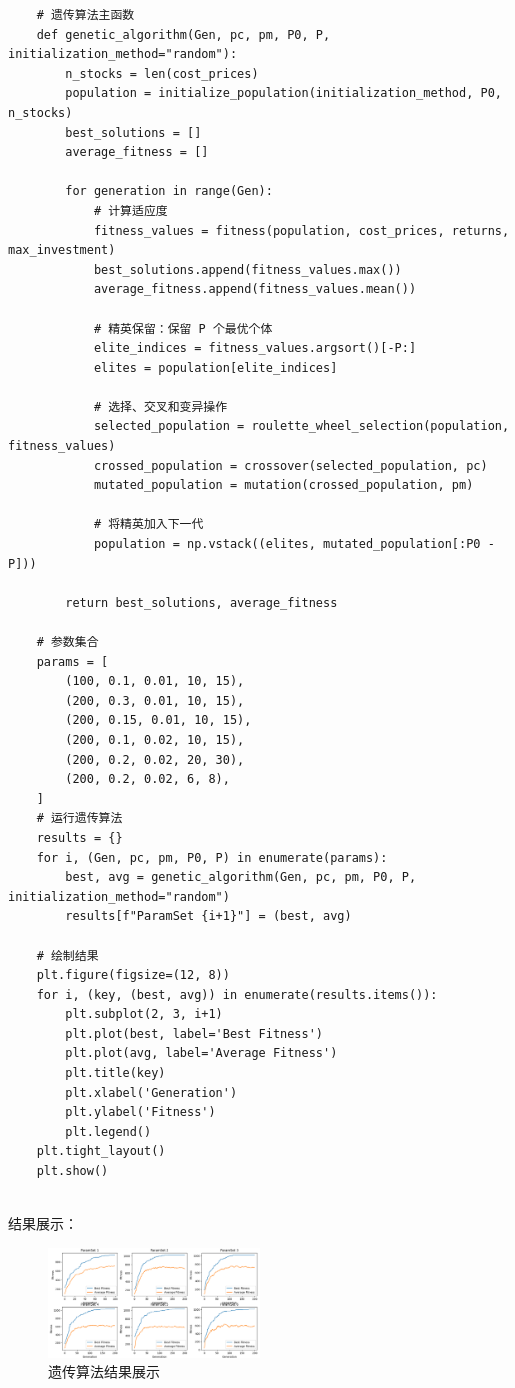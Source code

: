\documentclass[journal,twoside,web]{ieeecolor}
\begin{document}
\begin{lstlisting}
    # 遗传算法主函数
    def genetic_algorithm(Gen, pc, pm, P0, P, initialization_method="random"):
        n_stocks = len(cost_prices)
        population = initialize_population(initialization_method, P0, n_stocks)
        best_solutions = []
        average_fitness = []
    
        for generation in range(Gen):
            # 计算适应度
            fitness_values = fitness(population, cost_prices, returns, max_investment)
            best_solutions.append(fitness_values.max())
            average_fitness.append(fitness_values.mean())
    
            # 精英保留：保留 P 个最优个体
            elite_indices = fitness_values.argsort()[-P:]
            elites = population[elite_indices]
    
            # 选择、交叉和变异操作
            selected_population = roulette_wheel_selection(population, fitness_values)
            crossed_population = crossover(selected_population, pc)
            mutated_population = mutation(crossed_population, pm)
    
            # 将精英加入下一代
            population = np.vstack((elites, mutated_population[:P0 - P]))
    
        return best_solutions, average_fitness
    
    # 参数集合
    params = [
        (100, 0.1, 0.01, 10, 15),
        (200, 0.3, 0.01, 10, 15),
        (200, 0.15, 0.01, 10, 15),
        (200, 0.1, 0.02, 10, 15),
        (200, 0.2, 0.02, 20, 30),
        (200, 0.2, 0.02, 6, 8),
    ]
    # 运行遗传算法
    results = {}
    for i, (Gen, pc, pm, P0, P) in enumerate(params):
        best, avg = genetic_algorithm(Gen, pc, pm, P0, P, initialization_method="random")
        results[f"ParamSet {i+1}"] = (best, avg)
    
    # 绘制结果
    plt.figure(figsize=(12, 8))
    for i, (key, (best, avg)) in enumerate(results.items()):
        plt.subplot(2, 3, i+1)
        plt.plot(best, label='Best Fitness')
        plt.plot(avg, label='Average Fitness')
        plt.title(key)
        plt.xlabel('Generation')
        plt.ylabel('Fitness')
        plt.legend()
    plt.tight_layout()
    plt.show()
    
\end{lstlisting}

结果展示：
\begin{figure}[H]
    \centering
    \includegraphics[width=0.5\textwidth]{img/1.jpg}
    \caption{遗传算法结果展示}
\end{figure}
\end{document}
